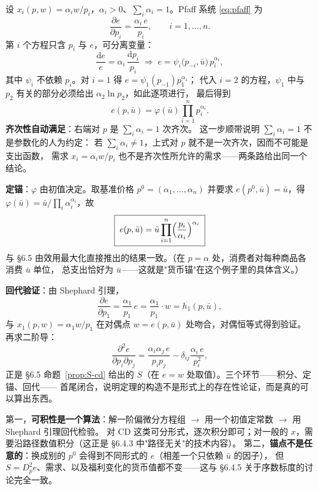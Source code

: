 \begin{example}[从 CD 需求积分出支出函数]\label{ex:cd-invert}
设 $x_i(p,w)=\alpha_iw/p_i$，$\alpha_i>0$、$\sum_i\alpha_i=1$。Pfaff 系统 \eqref{eq:pfaff} 为
\[
 \frac{\partial e}{\partial p_i}=\frac{\alpha_i\,e}{p_i},\qquad i=1,\ldots,n .
\]
第 $i$ 个方程只含 $p_i$ 与 $e$，可分离变量：
\[
 \frac{\mathrm de}{e}=\alpha_i\,\frac{\mathrm dp_i}{p_i}
 \;\Longrightarrow\;
 e=\psi_i\bigl(p_{-i},\bar u\bigr)\,p_i^{\alpha_i},
\]
其中 $\psi_i$ 不依赖 $p_i$。对 $i=1$ 得 $e=\psi_1(p_{-1})p_1^{\alpha_1}$；
代入 $i=2$ 的方程，$\psi_1$ 中与 $p_2$ 有关的部分必须给出 $\alpha_2\ln p_2$，如此逐项进行，
最后得到
\[
 e(p,\bar u)=\varphi(\bar u)\prod_{i=1}^{n}p_i^{\alpha_i}.
\]
\textbf{齐次性自动满足}：右端对 $p$ 是 $\sum_i\alpha_i=1$ 次齐次。
这一步顺带说明 $\sum_i\alpha_i=1$ 不是参数化的人为约定：
若 $\sum_i\alpha_i\ne1$，上式对 $p$ 就不是一次齐次，因而不可能是支出函数，
需求 $x_i=\alpha_iw/p_i$ 也不是齐次性所允许的需求——两条路给出同一个结论。

\textbf{定锚}：$\varphi$ 由初值决定。取基准价格 $p^0=(\alpha_1,\ldots,\alpha_n)$ 并要求
$e(p^0,\bar u)=\bar u$，得 $\varphi(\bar u)=\bar u\big/\prod_i\alpha_i^{\alpha_i}$，故
\[
 \boxed{\;e(p,\bar u)=\bar u\prod_{i=1}^{n}\Bigl(\frac{p_i}{\alpha_i}\Bigr)^{\alpha_i}\;}
\]
与 \S 6.5 由效用最大化直接推出的结果一致。（在 $p=\alpha$ 处，消费者对每种商品各消费 $\bar u$ 单位，
总支出恰好为 $\bar u$——这就是"货币锚"在这个例子里的具体含义。）

\textbf{回代验证}：由 Shephard 引理，
\[
 \frac{\partial e}{\partial p_1}=\frac{\alpha_1}{p_1}\,e
 =\frac{\alpha_1}{p_1}\cdot w=h_1(p,\bar u),
\]
与 $x_1(p,w)=\alpha_1w/p_1$ 在对偶点 $w=e(p,\bar u)$ 处吻合，对偶恒等式得到验证。
再求二阶导：
\[
 \frac{\partial^2e}{\partial p_i\partial p_j}
 =\frac{\alpha_i\alpha_j\,e}{p_ip_j}-\delta_{ij}\frac{\alpha_i\,e}{p_i^{2}},
\]
正是 \S 6.5 命题~\ref{prop:S-cd} 给出的 $S$（在 $e=w$ 处取值）。三个环节——积分、定锚、回代——
首尾闭合，说明定理的构造不是形式上的存在性论证，而是真的可以算出东西。
\end{example}

\begin{remark}[这个算例暴露的两件事]
第一，\textbf{可积性是一个算法}：解一阶偏微分方程组 $\to$ 用一个初值定常数 $\to$ 用 Shephard 引理回代检验。
对 CD 这类可分形式，逐次积分即可；对一般的 $x$，需要沿路径数值积分（这正是 \S 6.4.3 中"路径无关"的技术内容）。
第二，\textbf{锚点不是任意的}：换成别的 $p^0$ 会得到不同形式的 $e$（相差一个只依赖 $\bar u$ 的因子），
但 $S=D_p^2e$、需求、以及福利变化的货币值都不变——这与 \S 6.4.5 关于序数标度的讨论完全一致。
\end{remark}
